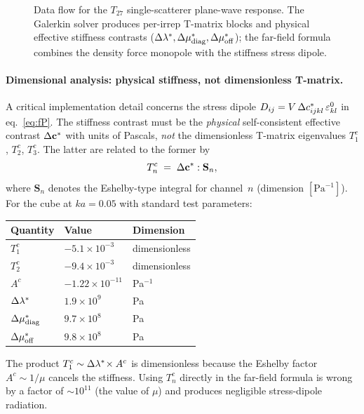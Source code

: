 \begin{figure}[ht]
\caption{Data flow for the $T_{27}$ single-scatterer plane-wave response.
The Galerkin solver produces per-irrep T-matrix blocks and physical
effective stiffness contrasts ($\Delta\lambda^*, \Delta\mu^*_\mathrm{diag},
\Delta\mu^*_\mathrm{off}$); the far-field formula combines the density
force monopole with the stiffness stress dipole.}
\label{fig:pipeline}
\end{figure}

\paragraph{Dimensional analysis: physical stiffness, not dimensionless
T-matrix.}
A critical implementation detail concerns the stress dipole
$D_{ij} = V\,\Delta c^*_{ijkl}\,\varepsilon^0_{kl}$ in
eq.~\eqref{eq:fP}.  The stiffness contrast must be the \emph{physical}
self-consistent effective contrast $\Delta\mathbf{c}^*$ with units of
Pascals, \emph{not} the dimensionless T-matrix eigenvalues
$T_1^c$, $T_2^c$, $T_3^c$.  The latter are related to the former by
\begin{equation}
  T_n^c \;=\; \Delta\mathbf{c}^* : \mathbf{S}_n,
  \label{eq:Tc-dimensionless}
\end{equation}
where $\mathbf{S}_n$ denotes the Eshelby-type integral for channel~$n$
(dimension $[\text{Pa}^{-1}]$).  For the cube at $ka = 0.05$ with
standard test parameters:
\begin{center}
\renewcommand{\arraystretch}{1.2}
\begin{tabular}{lll}
\toprule
Quantity & Value & Dimension \\
\midrule
$T_1^c$ & $-5.1 \times 10^{-3}$ & dimensionless \\
$T_2^c$ & $-9.4 \times 10^{-3}$ & dimensionless \\
$A^c$   & $-1.22 \times 10^{-11}$ & Pa$^{-1}$ \\
$\Delta\lambda^*$ & $1.9 \times 10^{9}$ & Pa \\
$\Delta\mu^*_{\mathrm{diag}}$ & $9.7 \times 10^{8}$ & Pa \\
$\Delta\mu^*_{\mathrm{off}}$  & $9.8 \times 10^{8}$ & Pa \\
\bottomrule
\end{tabular}
\end{center}
The product $T_1^c \sim \Delta\lambda^*\!\times A^c$ is dimensionless because
the Eshelby factor $A^c \sim 1/\mu$ cancels the stiffness.  Using $T_n^c$
directly in the far-field formula is wrong by a factor of $\sim\!10^{11}$
(the value of $\mu$) and produces negligible stress-dipole radiation.

